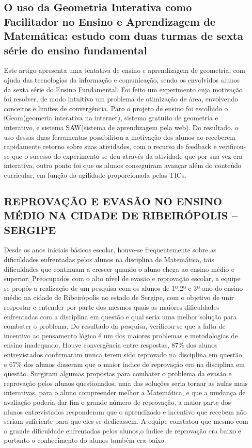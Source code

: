 \documentclass[12pt,a4paper]{article}
\begin{document}
\subsection{O uso da Geometria Interativa como Facilitador no Ensino e Aprendizagem de Matemática: 
estudo com duas turmas de sexta série do ensino fundamental}

Este artigo apresenta uma tentativa de ensino e aprendizagem de geometria, com ajuda das tecnologias da informação e comunicação, sendo os envolvidos alunos da sexta série do Ensino Fundamental. 
Foi feito um experimento cuja motivação foi resolver, de modo intuitivo um problema de otimização de área, envolvendo conceitos e limites de convergência. Paro o projeto de ensino foi escolhido o iGeom(geomeria interativa na internet), sistema gratuito de geometria e interativo, e sistema SAW(sistema de aprendizagem pela web).
Do resultado, o uso dessas duas ferramentas possibilitou a motivação dos alunos ao receberem rapidamente retorno sobre suas atividades, com o recurso de feedback e verificou-se que o sucesso do experimento se deu através da atividade que por sua vez era interativa, outro ponto foi que os alunos conseguiram avançar além do conteúdo curricular, em função da agilidade proporcionada pelas TICs. 

\subsection{REPROVAÇÃO E EVASÃO NO ENSINO MÉDIO NA CIDADE DE  RIBEIRÓPOLIS – SERGIPE}
Desde os anos iniciais básicos escolar, houve-se frequentemente sobre as dificuldades enfrentadas pelos alunos na disciplina de Matemática, tais dificuldades que continuam a crescer quando o aluno chega ao ensino médio e superior. Preocupados com o alto nível de evasão e reprovação escolar, a equipe se propôs a realização de um pesquisa com os alunos de 1º,2º e 3º ano do ensino médio na cidade de Ribeirópolis no estado de Sergipe, com o objetivo de unir respostar e entender por parte dos mesmos quais as maiores dificuldades enfrentadas com a disciplina em questão e qual seria uma melhor solução para combater o problema.
Do resultado da pesquisa, verificou-se que a falta de incentivo ao pensamento lógico é um dos maiores problemas e metodologias de ensino inadequado. Houve convergência entre respostas, 87\% dos alunos entrevistados confirmaram nunca terem sido reprovado na disciplina em questão, e 67\% dos alunos disseram que o maior índice de reprovação era na disciplina em questão. 
Surgiram algumas propostas para combater o problema da evasão e reprovação pelos alunos questionados, uma das soluções seria tornar as aulas mais interativas, para o aluno compreender melhor a Matemática, e que a mudança de avaliação poderia dar fim o grande número de reprovação, a maior parte dos alunos entrevistados responderam que o aprendizado e incentivo que recebem não seriam suficiente para que eles se dedicassem. 
A equipe constatou que mesmo com a grande dificuldade enfrentadas pelos alunos,o índice de reprovação era baixo e portanto o conhecimento do alunos também era baixo.
\end{document}
